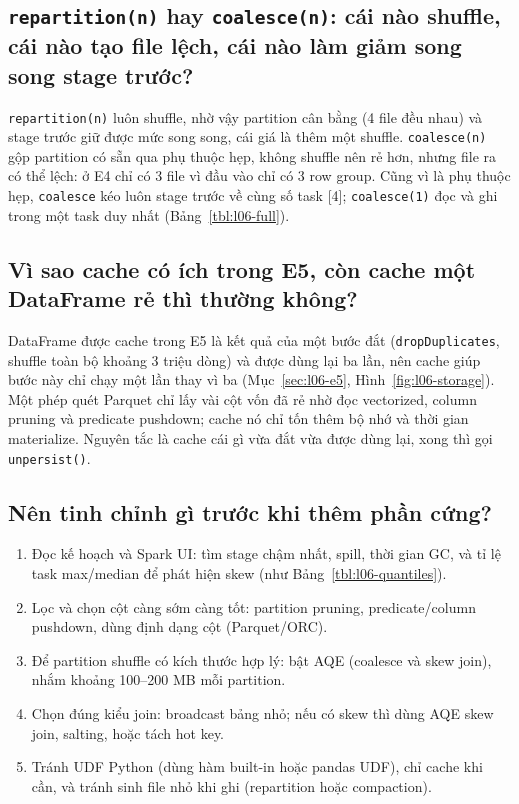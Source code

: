 \documentclass[
  12pt,
  a4paper,
]{article}
\providecommand{\tightlist}{%
  \setlength{\itemsep}{0pt}\setlength{\parskip}{0pt}}
\begin{document}
\subsection{\texorpdfstring{\texttt{repartition(n)} hay
\texttt{coalesce(n)}: cái nào shuffle, cái nào tạo file lệch, cái nào
làm giảm song song stage
trước?}{repartition(n) hay coalesce(n): cái nào shuffle, cái nào tạo file lệch, cái nào làm giảm song song stage trước?}}\label{sec:l06-q6}

\texttt{repartition(n)} luôn shuffle, nhờ vậy partition cân bằng (4 file
đều nhau) và stage trước giữ được mức song song, cái giá là thêm một
shuffle. \texttt{coalesce(n)} gộp partition có sẵn qua phụ thuộc hẹp,
không shuffle nên rẻ hơn, nhưng file ra có thể lệch: ở E4 chỉ có 3 file
vì đầu vào chỉ có 3 row group. Cũng vì là phụ thuộc hẹp,
\texttt{coalesce} kéo luôn stage trước về cùng số task {[}4{]};
\texttt{coalesce(1)} đọc và ghi trong một task duy nhất
(Bảng~\ref{tbl:l06-full}).

\subsection{Vì sao cache có ích trong E5, còn cache một DataFrame rẻ thì
thường không?}\label{sec:l06-q7}

DataFrame được cache trong E5 là kết quả của một bước đắt
(\texttt{dropDuplicates}, shuffle toàn bộ khoảng 3 triệu dòng) và được
dùng lại ba lần, nên cache giúp bước này chỉ chạy một lần thay vì ba
(Mục~\ref{sec:l06-e5}, Hình~\ref{fig:l06-storage}). Một phép quét
Parquet chỉ lấy vài cột vốn đã rẻ nhờ đọc vectorized, column pruning và
predicate pushdown; cache nó chỉ tốn thêm bộ nhớ và thời gian
materialize. Nguyên tắc là cache cái gì vừa đắt vừa được dùng lại, xong
thì gọi \texttt{unpersist()}.

\subsection{Nên tinh chỉnh gì trước khi thêm phần
cứng?}\label{sec:l06-q8}

\begin{enumerate}
\def\labelenumi{\arabic{enumi}.}
\tightlist
\item
  Đọc kế hoạch và Spark UI: tìm stage chậm nhất, spill, thời gian GC, và
  tỉ lệ task max/median để phát hiện skew (như
  Bảng~\ref{tbl:l06-quantiles}).
\item
  Lọc và chọn cột càng sớm càng tốt: partition pruning, predicate/column
  pushdown, dùng định dạng cột (Parquet/ORC).
\item
  Để partition shuffle có kích thước hợp lý: bật AQE (coalesce và skew
  join), nhắm khoảng 100--200 MB mỗi partition.
\item
  Chọn đúng kiểu join: broadcast bảng nhỏ; nếu có skew thì dùng AQE skew
  join, salting, hoặc tách hot key.
\item
  Tránh UDF Python (dùng hàm built-in hoặc pandas UDF), chỉ cache khi
  cần, và tránh sinh file nhỏ khi ghi (repartition hoặc compaction).
\end{enumerate}
\end{document}
